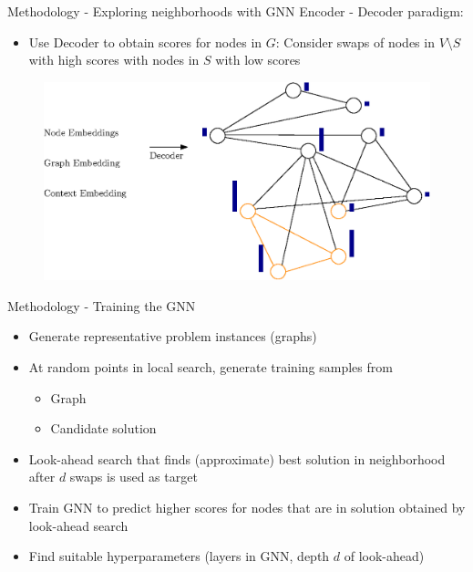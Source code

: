\documentclass{beamer}
\begin{document}
\begin{frame}{Methodology - Exploring neighborhoods with GNN}
Encoder - Decoder paradigm: 
    \begin{itemize}
            \item Use Decoder to obtain scores for nodes in $G$: Consider swaps of nodes in $V \setminus S$ with high scores with nodes in $S$ with low scores 
    \end{itemize}
    \begin{figure}
        \centering
        \includegraphics[width=\textwidth]{graphics/graph-decoder.eps}
    \end{figure}
\end{frame}

\begin{frame}{Methodology - Training the GNN}
    \begin{itemize}
        \item<1-> Generate representative problem instances (graphs)
        \item<2-> At random points in local search, generate training samples from
        \begin{itemize}
            \item Graph
            \item Candidate solution
        \end{itemize}
        \item<3-> Look-ahead search that finds (approximate) best solution in neighborhood after $d$ swaps is used as target
        \item<4-> Train GNN to predict higher scores for nodes that are in solution obtained by look-ahead search
        \item<5-> Find suitable hyperparameters (layers in GNN, depth $d$ of look-ahead)
    \end{itemize}
\end{frame}
\end{document}
